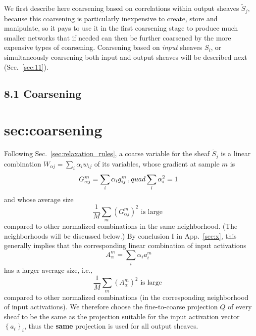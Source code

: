 \documentclass{article} %
\begin{document}

We first describe here coarsening based on correlations within output sheaves $\tilde{S}_j$, because this coarsening is particularly inexpensive to create, store and manipulate, so it pays to use it in the first coarsening stage to produce much smaller networks that if needed can then be further coarsened by the more expensive types of coarsening. Coarsening based on {\it input} sheaves $S_i$, or simultaneously coarsening both input and output sheaves will be described next (Sec.~\ref{sec:11}).

\subsection{8.1 Coarsening}
\section{sec:coarsening}
Following Sec.~\ref{sec:relaxation_rules}, a coarse variable for the sheaf $\tilde{S}_j$ is a linear combination $W_{\alpha j} = \sum_i \alpha_i w_{ij}$ of its variables, whose gradient at sample $m$ is
$$ G^m_{\alpha j} = \sum_i \alpha_i g^m_{ij}\,, \\quad \sum_i \alpha_i^2 = 1 $$
and whose average size
\begin{equation}
    \frac{1}{M} \sum_m \left(G^m_{\alpha j} \right)^2 \text{ is large }
    \label{parameter_large_avg_size}
\end{equation}
compared to other normalized combinations in the same neighborhood. (The neighborhoods will be discussed below.) By conclusion I in App.~\ref{sec:x}, this generally implies that the corresponding linear combination of input activations
$$A^m_{\alpha} = \sum_i \alpha_i a^m_i$$
has a larger average size, i.e.,
\begin{equation}
    \frac{1}{M} \sum_m \left(A^m_{\alpha} \right)^2 \text{ is large }
    \label{activation_large_avg_size}
\end{equation}
compared to other normalized combinations (in the corresponding neighborhood of input activations). We therefore choose the fine-to-coarse projection $Q$ of every sheaf to be the same as the projection suitable for the input activation vector $\left\{a_i\right\}_i$, thus the \textbf{same} projection is used for all output sheaves.
\end{document}
